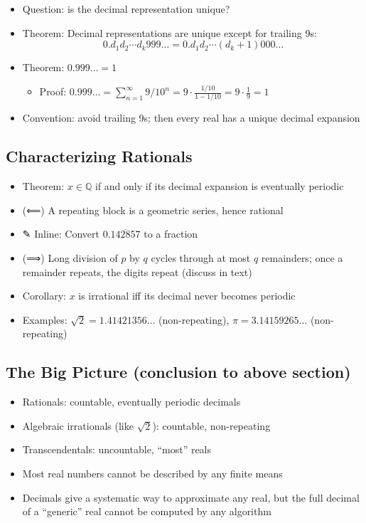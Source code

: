 \documentclass[
  10pt,
  letterpaper,
]{scrbook}
\providecommand{\tightlist}{%
  \setlength{\itemsep}{0pt}\setlength{\parskip}{0pt}}
\newcommand{\QQ}{\mathbb{Q}}
\begin{document}
\begin{itemize}
\tightlist
\item
  Question: is the decimal representation unique?
\item
  Theorem: Decimal representations are unique except for trailing 9s:
  \[0.d_1 d_2 \cdots d_k 999\ldots = 0.d_1 d_2 \cdots (d_k + 1) 000\ldots\]
\item
  Theorem: \(0.999\ldots = 1\)

  \begin{itemize}
  \tightlist
  \item
    Proof:
    \(0.999\ldots = \sum_{n=1}^{\infty} 9/10^n = 9 \cdot \frac{1/10}{1 - 1/10} = 9 \cdot \frac{1}{9} = 1\)
  \end{itemize}
\item
  Convention: avoid trailing 9s; then every real has a unique decimal
  expansion
\end{itemize}

\subsection{Characterizing Rationals}\label{characterizing-rationals}

\begin{itemize}
\tightlist
\item
  Theorem: \(x \in \QQ\) if and only if its decimal expansion is
  eventually periodic
\item
  (⟸) A repeating block is a geometric series, hence rational
\item
  ✎ Inline: Convert \(0.\overline{142857}\) to a fraction
\item
  (⟹) Long division of \(p\) by \(q\) cycles through at most \(q\)
  remainders; once a remainder repeats, the digits repeat (discuss in
  text)
\item
  Corollary: \(x\) is irrational iff its decimal never becomes periodic
\item
  Examples: \(\sqrt{2} = 1.41421356\ldots\) (non-repeating),
  \(\pi = 3.14159265\ldots\) (non-repeating)
\end{itemize}

\subsection{The Big Picture (conclusion to above
section)}\label{the-big-picture-conclusion-to-above-section}

\begin{itemize}
\tightlist
\item
  Rationals: countable, eventually periodic decimals
\item
  Algebraic irrationals (like \(\sqrt{2}\)): countable, non-repeating
\item
  Transcendentals: uncountable, ``most'' reals
\item
  Most real numbers cannot be described by any finite means
\item
  Decimals give a systematic way to approximate any real, but the full
  decimal of a ``generic'' real cannot be computed by any algorithm
\end{itemize}
\end{document}
